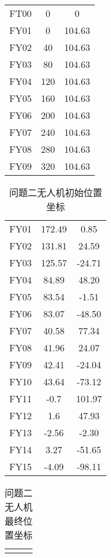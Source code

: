 \documentclass{cumcmthesis}
\begin{document}
\begin{appendices}
\begin{table}[H]
\begin{tabular}{ccc}
			\midrule[1pt]
			FT00 & 0 & 0\\
			FY01 &0 &  104.63\\
			FY02 & 40 & 104.63\\
			FY03 & 80 &  104.63\\ 
			FY04 & 120 & 104.63\\
			FY05 & 160 & 104.63\\
			FY06 & 200 &  104.63\\
			FY07 & 240 &  104.63 \\
			FY08 & 280 & 104.63\\
			FY09 & 320 &  104.63\\
			
			\bottomrule[1.5pt]
		\end{tabular}
	\end{table}	

\begin{table}[H]
	\caption{问题二无人机初始位置坐标}\label{tab:4} \centering
	\begin{tabular}{ccc}
		\toprule[1.5pt]
		\makebox[0.25\textwidth][c]{无人机编号}	&  \makebox[0.25\textwidth][c]{x}& \makebox[0.25\textwidth][c]{y}\\
		\midrule[1pt]
		FY01&172.49&	0.85\\
		FY02&131.81&24.59\\
		FY03&125.57&	-24.71\\
		FY04&84.89&	48.20\\
		FY05&83.54&	-1.51\\
		FY06&83.07&	-48.50\\
		FY07&40.58&	77.34\\
		FY08&41.96&	24.07\\
		FY09&42.41&	-24.04\\
		FY10&43.64&	-73.12\\
		FY11&-0.7&	101.97\\
		FY12&1.6&	47.93\\
		FY13&-2.56&	-2.30\\
		FY14&3.27&	-51.65\\
		FY15&-4.09&	-98.11\\
		
		\bottomrule[1.5pt]
	\end{tabular}
\end{table}	
	\begin{table}[H]
	\caption{问题二无人机最终位置坐标}\label{tab:5} \centering
	\begin{tabular}{ccc}
		\toprule[1.5pt]
		\makebox[0.25\textwidth][c]{无人机编号}	&  \makebox[0.25\textwidth][c]{x}& \makebox[0.25\textwidth][c]{y}\\
		

\end{tabular}
\end{table}
\end{appendices}
\end{document}
